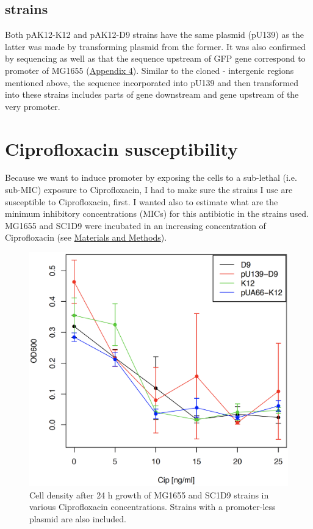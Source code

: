 \subsection{ strains}
Both pA\textunderscore K12-K12 and pA\textunderscore K12-D9 strains have the same plasmid (pU139) as the latter was made by transforming plasmid from the former.
It was also confirmed by sequencing as well as that the sequence upstream of GFP gene correspond to  promoter of MG1655 (\hyperlink{precAalign}{Appendix 4}).
Similar to the cloned - intergenic regions mentioned above, the sequence incorporated into pU139 and then transformed into these  strains includes parts of  gene downstream and  gene upstream of the very promoter.


\section{Ciprofloxacin susceptibility}
Because we want to induce  promoter by exposing the cells to a sub-lethal (i.e. sub-MIC) exposure to Ciprofloxacin, I had to make sure the strains I use are susceptible to Ciprofloxacin, first.
I wanted also to estimate what are the minimum inhibitory concentrations (MICs) for this antibiotic in the strains used.
MG1655 and SC1\textunderscore D9 were incubated in an increasing concentration of Ciprofloxacin (see \hyperlink{MIC}{Materials and Methods}).
\begin{figure}[b!]
  \centering
  \includegraphics[scale=0.25]{text/Pictures/KillCurve.png}
	\caption{Cell density after 24 h growth of MG1655 and SC1\textunderscore D9 strains in various Ciprofloxacin concentrations. Strains with a promoter-less plasmid are also included.}
	\label{killing}
\end{figure}
